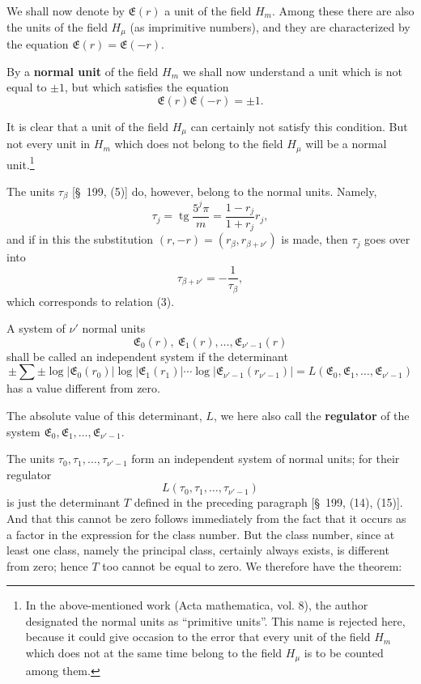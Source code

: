 \documentclass[11pt]{article}
\newcommand{\tg}{\operatorname{tg}}
\begin{document}
We shall now denote by $\mathfrak E(r)$ a unit of the field $H_m$. Among these there are also the units of the field $H_\mu$ (as
imprimitive numbers), and they are characterized by the equation $\mathfrak E(r)=\mathfrak E(-r)$.

By a \textbf{normal unit} of the field $H_m$ we shall now understand a unit which is not equal to $\pm1$, but which satisfies the equation
\begin{equation}
\mathfrak E(r)\mathfrak E(-r)=\pm1.
\tag{3}
\end{equation}

It is clear that a unit of the field $H_\mu$ can certainly not satisfy this condition. But not every unit in $H_m$ which does not belong to the field $H_\mu$ will be a normal unit.\footnote{In the above-mentioned work (Acta mathematica, vol. 8), the author designated the normal units as ``primitive units''. This name is rejected here, because it could give occasion to the error that every unit of the field $H_m$ which does not at the same time belong to the field $H_\mu$ is to be counted among them.}

The units $\tau_\beta$ [\S~199, (5)] do, however, belong to the normal units. Namely,
\begin{equation}
\tau_j=\tg\frac{5^j\pi}{m}=\frac{1-r_j}{1+r_j}r_j,
\tag{4}
\end{equation}
and if in this the substitution $(r,-r)=(r_\beta,r_{\beta+\nu'})$ is made, then $\tau_j$ goes over into
\begin{equation}
\tau_{\beta+\nu'}=-\frac1{\tau_\beta},
\tag{5}
\end{equation}
which corresponds to relation (3).

A system of $\nu'$ normal units
\[
\mathfrak E_0(r),\ \mathfrak E_1(r),\ldots,\mathfrak E_{\nu'-1}(r)
\]
shall be called an independent system if the determinant
\begin{equation}
\pm\sum\pm\log|\mathfrak E_0(r_0)|\log|\mathfrak E_1(r_1)|\cdots\log|\mathfrak E_{\nu'-1}(r_{\nu'-1})|
=L(\mathfrak E_0,\mathfrak E_1,\ldots,\mathfrak E_{\nu'-1})
\tag{6}
\end{equation}
has a value different from zero.

The absolute value of this determinant, $L$, we here also call the \textbf{regulator} of the system $\mathfrak E_0,\mathfrak E_1,\ldots,\mathfrak E_{\nu'-1}$.

The units $\tau_0,\tau_1,
\ldots,\tau_{\nu'-1}$ form an independent system of normal units; for their regulator
\[
L(\tau_0,\tau_1,\ldots,\tau_{\nu'-1})
\]
is just the determinant $T$ defined in the preceding paragraph [\S~199, (14), (15)]. And that this cannot be zero follows immediately from the fact that it occurs as a factor in the expression for the
class number. But the class number, since at least one class, namely the principal class, certainly always exists, is different from zero; hence $T$ too cannot be equal to zero. We therefore have the theorem:
\end{document}

